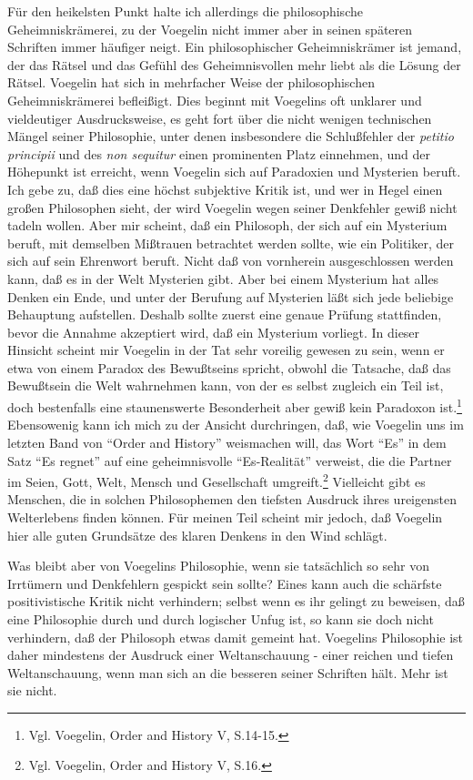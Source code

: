 Für den heikelsten Punkt halte ich allerdings die philosophische
Geheimniskrämerei, zu der Voegelin nicht immer aber in seinen späteren
Schriften immer häufiger neigt. Ein philosophischer Geheimniskrämer ist
jemand, der das Rätsel und das Gefühl des Geheimnisvollen mehr liebt als
die Lösung der Rätsel. Voegelin hat sich in mehrfacher Weise der
philosophischen Geheimniskrämerei befleißigt. Dies beginnt mit Voegelins
oft unklarer und vieldeutiger Ausdrucksweise, es geht fort über die
nicht wenigen technischen Mängel seiner Philosophie, unter denen
insbesondere die Schlußfehler der {\it petitio principii} und des {\it
  non sequitur} einen prominenten Platz einnehmen, und der Höhepunkt ist
erreicht, wenn Voegelin sich auf Paradoxien und Mysterien beruft. Ich
gebe zu, daß dies eine höchst subjektive Kritik ist, und wer in Hegel
einen großen Philosophen sieht, der wird Voegelin wegen seiner
Denkfehler gewiß nicht tadeln wollen. Aber mir scheint, daß ein
Philosoph, der sich auf ein Mysterium beruft, mit demselben Mißtrauen
betrachtet werden sollte, wie ein Politiker, der sich auf sein Ehrenwort
beruft. Nicht daß von vornherein ausgeschlossen werden kann, daß es in
der Welt Mysterien gibt. Aber bei einem Mysterium hat alles Denken ein
Ende, und unter der Berufung auf Mysterien läßt sich jede beliebige
Behauptung aufstellen. Deshalb sollte zuerst eine genaue Prüfung
stattfinden, bevor die Annahme akzeptiert wird, daß ein Mysterium
vorliegt. In dieser Hinsicht scheint mir Voegelin in der Tat sehr
voreilig gewesen zu sein, wenn er etwa von einem Paradox des Bewußtseins
spricht, obwohl die Tatsache, daß das Bewußtsein die Welt wahrnehmen
kann, von der es selbst zugleich ein Teil ist, doch bestenfalls eine
staunenswerte Besonderheit aber gewiß kein Paradoxon ist.\footnote{Vgl.
  Voegelin, Order and History V, S.14-15.} Ebensowenig kann ich mich zu
der Ansicht durchringen, daß, wie Voegelin uns im letzten Band von
"`Order and History"' weismachen will, das Wort "`Es"' in dem Satz "`Es
regnet"' auf eine geheimnisvolle "`Es-Realität"' verweist, die die
Partner im Seien, Gott, Welt, Mensch und Gesellschaft
umgreift.\footnote{Vgl. Voegelin, Order and History V, S.16.} Vielleicht
gibt es Menschen, die in solchen Philosophemen den tiefsten Ausdruck
ihres ureigensten Welterlebens finden können. Für meinen Teil scheint
mir jedoch, daß Voegelin hier alle guten Grundsätze des klaren Denkens
in den Wind schlägt.

Was bleibt aber von Voegelins Philosophie, wenn sie tatsächlich so sehr von
Irrtümern und Denkfehlern gespickt sein sollte? Eines kann auch die schärfste
positivistische Kritik nicht verhindern; selbst wenn es ihr gelingt zu
beweisen, daß eine Philosophie durch und durch logischer Unfug ist, so kann
sie doch nicht verhindern, daß der Philosoph etwas damit gemeint
hat. Voegelins Philosophie ist daher mindestens der Ausdruck einer
Weltanschauung - einer reichen und tiefen Weltanschauung, wenn man sich an die
besseren seiner Schriften hält. Mehr ist sie nicht.

